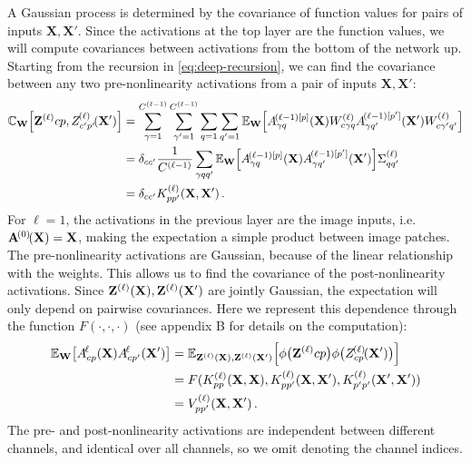 \documentclass[tablecaption=bottom,wcp,nonatbib]{jmlr} %
\newcommand{\vX}{\mathbf{X}}
\newcommand{\vW}{\mathbf{W}}
\begin{document}
A Gaussian process is determined by the covariance of function values for pairs of inputs $\vX,\vX'$. Since the activations at the top layer are the function values, we will compute covariances between activations from the bottom of the network up.
Starting from the recursion in \cref{eq:deep-recursion}, we can find the covariance between any two pre-nonlinearity activations from a pair of inputs $\vX,\vX'$:
\begin{align}
    \mathbb{C}_{\vW}\left[\layerAs{\ell}{cp}, \layerAsd{\ell}{c'p'} \right] &= \sum_{\gamma=1}^{\layerC{\ell-1}} \sum_{\gamma'=1}^{\layerC{\ell-1}} \sum_{q=1}^{}\sum_{q'=1}^{} \Exp{\vW}{\layerNLAs{(\ell-1)[p]}{\gamma q}\layerWs{\ell}_{c\gamma q} \layerNLAsd{(\ell-1)[p']}{\gamma q'}\layerWs{\ell}_{c\gamma' q'}} \nonumber \\
    &= \delta_{cc'} \frac{1}{\layerC{\ell-1}} \sum_{\gamma qq'} \Exp{\vW}{\layerNLAs{(\ell-1)[p]}{\gamma q} \layerNLAsd{(\ell-1)[p']}{\gamma q'}} \priorWcovs{\ell}_{qq'} \nonumber \\
    &= \delta_{cc'} K^{(\ell)}_{pp'}(\vX, \vX') \label{eq:kernel-recursion} \,.
\end{align}
For $\ell=1$, the activations in the previous layer are the image inputs, i.e.~$\layerNLA{(0)}{} = \vX$, making the expectation a simple product between image patches. The pre-nonlinearity activations are Gaussian, because of the linear relationship with the weights. This allows us to find the covariance of the post-nonlinearity activations. Since $\layerA{\ell}{},\layerAd{\ell}{}$ are jointly Gaussian, the expectation will only depend on pairwise covariances. Here we represent this dependence through the function $F(\cdot, \cdot, \cdot)$ (see appendix B for details on the computation):
\begin{align}
    \Exp{\vW}{\layerNLAs{\ell}{cp}\layerNLAsd{\ell}{cp'}} &= \Exp{ \layerA{\ell}{}, \layerAd{\ell}{} }{\phi\big(\layerAs{\ell}{cp}\big) \phi\big(\layerAsd{\ell}{cp}\big)} \label{eq:post-nonlin} \nonumber \\
    &= F(K^{(\ell)}_{pp}(\vX, \vX), K^{(\ell)}_{pp'}(\vX, \vX'), K^{(\ell)}_{p'p'}(\vX', \vX'))\nonumber\\
    &= V_{pp'}^{(\ell)}(\vX, \vX')\,.
\end{align}
The pre- and post-nonlinearity activations are independent between different channels, and identical over all channels, so we omit denoting the channel indices.
\end{document}
